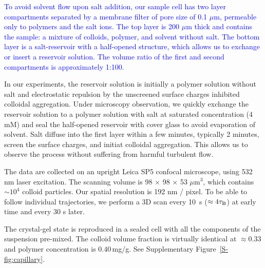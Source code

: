 \documentclass[preprint,amsmath,amssymb,superscriptaddress]{revtex4-1}
\begin{document}
\textcolor{blue}{To avoid solvent flow upon salt addition, our sample cell has two layer compartments separated by a membrane filter of pore size of 0.1 $\mu$m, permeable only to polymers and the salt ions. The top layer is 200 $\mu$m thick and contains the sample: a mixture of colloids, polymer, and solvent without salt. The bottom layer is a salt-reservoir with a half-opened structure, which allows us to exchange or insert a reservoir solution. The volume ratio of the first and second compartments is approximately 1:100.}

In our experiments, the reservoir solution is initially a polymer solution without salt and electrostatic repulsion by the unscreened surface charges inhibited colloidal aggregation. Under microscopy observation, we quickly exchange the reservoir solution to a polymer solution with salt at saturated concentration (4 mM) and seal the half-opened reservoir with cover glass to avoid evaporation of solvent. Salt diffuse into the first layer within a few minutes, typically 2 minutes, screen the surface charges, and initiat colloidal aggregation. This allows us to observe the process without suffering from harmful turbulent flow.

The data are collected on an upright Leica SP5 confocal microscope, using 532 nm laser excitation. The scanning volume is 98 $\times$ 98 $\times$ 53 $\mu$m$^3$, which contains $\sim 10^4$ colloid particles. Our spatial resolution is 192 nm / pixel. To be able to follow individual trajectories, we perform a 3D scan every 10~s ($\approx 4\tau_{\rm B}$) at early time and every 30 s later.


The crystal-gel state is reproduced in a sealed cell with all the components of the suspension pre-mixed. The colloid volume fraction is virtually identical at $\approx 0.33$ and polymer concentration is $0.40\,$mg/g. See Supplementary Figure~\ref{S-fig:capillary}.





%
\end{document}
